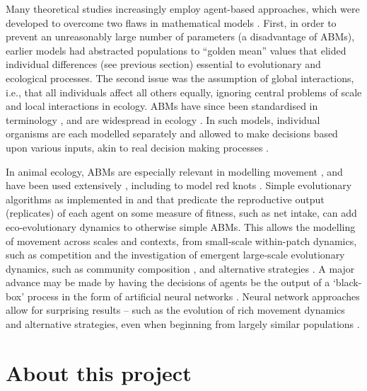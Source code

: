 Many theoretical studies increasingly employ agent-based approaches, which were developed to overcome two flaws in mathematical models \citep{huston1988}. First, in order to prevent an unreasonably large number of parameters (a disadvantage of ABMs), earlier models had abstracted populations to ``golden mean'' values that elided individual differences (see previous section) essential to evolutionary and ecological processes. The second issue was the assumption of global interactions, i.e., that all individuals affect all others equally, ignoring central problems of scale \citep{levin1992} and local interactions \citep[see][]{legendre1993} in ecology. ABMs have since been standardised in terminology \citep{grimm2006, grimm2010}, and are widespread in ecology \citep{deangelis2018}. In such models, individual organisms are each modelled separately and allowed to make decisions based upon various inputs, akin to real decision making processes \citep{deangelis2019}. 

In animal ecology, ABMs are especially relevant in modelling movement \citep[reviewed in][]{deangelis2005}, and have been used extensively \citep{spiegel2017, spiegel2013, getz2015, getz2016}, including to model red knots \citep{vangils2010}. Simple evolutionary algorithms \citep[see][]{back1996} as implemented in \citet{getz2015} and \citet{netz2017} that predicate the reproductive output (replicates) of each agent on some measure of fitness, such as net intake, can add eco-evolutionary dynamics to otherwise simple ABMs. This allows the modelling of movement across scales and contexts, from small-scale within-patch dynamics, such as competition \citep[see][ for a primer]{keddy2001} and the investigation of emergent large-scale evolutionary dynamics, such as community composition \citep[\emph{movement guilds};][]{getz2015}, and alternative strategies \citep{netz2017}. A major advance may be made by having the decisions of agents be the output of a `black-box' process in the form of artificial neural networks \citep[ANNs; see][ for example implementation]{lek1999, enquist2013, netz2017}. Neural network approaches allow for surprising results -- such as the evolution of rich movement dynamics and alternative strategies, even when beginning from largely similar populations \citep{netz2017, }.

\chapter{About this project}

